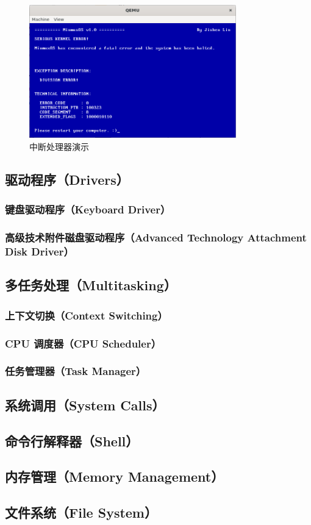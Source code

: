 \begin{figure}[htbp]
    \centering
    \includegraphics[width=0.8\textwidth]{figures/InterruptHandlerPresentation.png}
    \caption{中断处理器演示}
    \label{fig:InterruptHandlerPresentation}
\end{figure}

\subsection{驱动程序（Drivers）}

\subsubsection{键盘驱动程序（Keyboard Driver）}

\subsubsection{高级技术附件磁盘驱动程序（Advanced Technology Attachment Disk Driver）}

\subsection{多任务处理（Multitasking）}

\subsubsection{上下文切换（Context Switching）}

\subsubsection{CPU 调度器（CPU Scheduler）}

\subsubsection{任务管理器（Task Manager）}

\subsection{系统调用（System Calls）}

\subsection{命令行解释器（Shell）}

\subsection{内存管理（Memory Management）}

\subsection{文件系统（File System）}